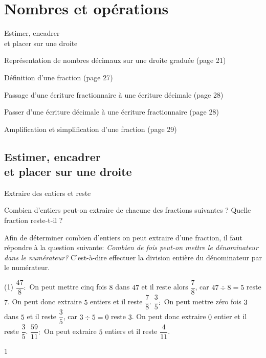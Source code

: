 \documentclass[a4paper,12pt]{report}
\begin{document}
\newcommand{\chapterName}{Nombres et opérations}
\newcommand{\serieName}{Estimer, encadrer \\et placer sur une droite}


\chapter*{\chapterName}
\thispagestyle{empty}

\begin{amL}{\serieName}{
	\item Représentation de nombres décimaux sur une droite graduée (page 21)
\item Définition d'une fraction (page 27)
\item Passage d'une écriture fractionnaire à une écriture décimale (page 28)
\item Passer d'une écriture décimale à une écriture fractionnaire (page 28)
\item Amplification et simplification d'une fraction (page 29)
}
\end{amL}
\section*{\serieName}
\setcounter{page}{1}
\thispagestyle{firstPage}



\begin{resolu}{Extraire des entiers et reste}{
Combien d'entiers peut-on extraire de chacune des fractions suivantes ?
Quelle fraction reste-t-il ?

 Afin de déterminer combien d'entiers on peut extraire d'une fraction, il faut répondre à la question suivante: \emph{Combien de fois peut-on mettre le dénominateur dans le numérateur?} C'est-à-dire effectuer la division entière du dénominateur par le numérateur. 

\begin{tasks}(1)
	\task $\dfrac{47}{8}:$ On peut mettre cinq fois $8$ dans $47$ et il reste alors $\dfrac{7}{8}$, car $47\div 8=5$ reste $7$. On peut donc extraire $5$ entiers et il reste $\dfrac{7}{8}$.  
	\task $\dfrac{3}{5}:$ On peut mettre zéro fois $3$ dans $5$ et il reste $\dfrac{3}{5}$, car $3\div 5=0$ reste $3$. On peut donc extraire $0$ entier et il reste $\dfrac{3}{5}$. 
	\task $\dfrac{59}{11}:$ On peut extraire $5$ entiers et il reste $\dfrac{4}{11}$. 
\end{tasks}
}{1}
\end{resolu}
\end{document}
